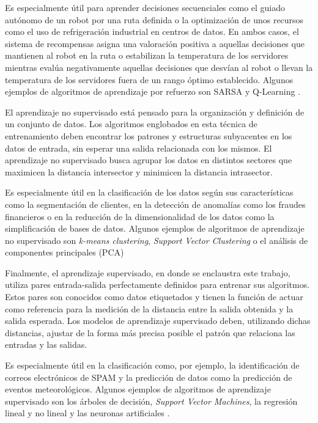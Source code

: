 Es especialmente útil para aprender decisiones secuenciales como el guiado autónomo de un robot por una ruta definida o la optimización de unos recursos como el uso de refrigeración industrial en centros de datos. En ambos casos, el sistema de recompensas asigna una valoración positiva a aquellas decisiones que mantienen al robot en la ruta o estabilizan la temperatura de los servidores mientras evalúa negativamente aquellas decisiones que desvían al robot o llevan la temperatura de los servidores fuera de un rango óptimo establecido. Algunos ejemplos de algoritmos de aprendizaje por refuerzo son SARSA y Q-Learning \cite{deeplearning}.


El aprendizaje no supervisado está pensado para la organización y definición de un conjunto de datos. Los algoritmos englobados en esta técnica de entrenamiento deben encontrar los patrones y estructuras subyacentes en los datos de entrada, sin esperar una salida relacionada con los mismos. El aprendizaje no supervisado busca agrupar los datos en distintos sectores que maximicen la distancia intersector y minimicen la distancia intrasector.

Es especialmente útil en la clasificación de los datos según sus características como la segmentación de clientes, en la detección de anomalías como los fraudes financieros o en la reducción de la dimensionalidad de los datos como la simplificación de bases de datos. Algunos ejemplos de algoritmos de aprendizaje no supervisado son \textit{k-means clustering}, \textit{Support Vector Clustering} o el análisis de componentes principales (PCA) \cite{mitchell1997}

Finalmente, el aprendizaje supervisado, en donde se enclaustra este trabajo, utiliza pares entrada-salida perfectamente definidos para entrenar sus algoritmos. Estos pares son conocidos como datos etiquetados y tienen la función de actuar como referencia para la medición de la distancia entre la salida obtenida y la salida esperada. Los modelos de aprendizaje supervisado deben, utilizando dichas distancias, ajustar de la forma más precisa posible el patrón que relaciona las entradas y las salidas.

Es especialmente útil en la clasificación como, por ejemplo, la identificación de correos electrónicos de SPAM y la predicción de datos como la predicción de eventos meteorológicos. Algunos ejemplos de algoritmos de aprendizaje supervisado son los árboles de decisión, \textit{Support Vector Machines}, la regresión lineal y no lineal y las neuronas artificiales \cite{machinelearningbook, machinelearningbook1}.

